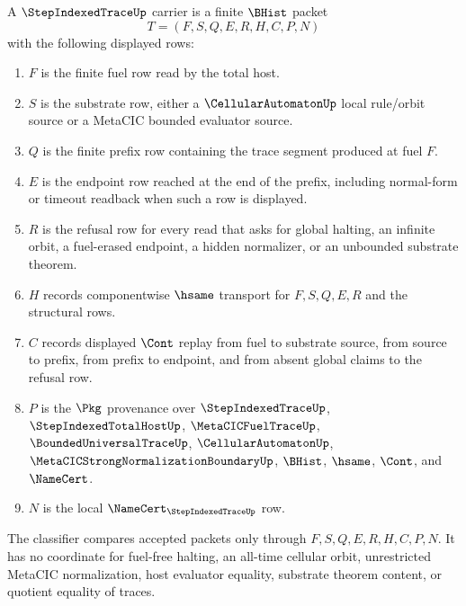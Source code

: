 \begin{definition}
\label{def:step-indexed-trace-carrier}
A $\StepIndexedTraceUp$ carrier is a finite $\BHist$ packet
$$
T=(F,S,Q,E,R,H,C,P,N)
$$
with the following displayed rows:
\begin{enumerate}
\item $F$ is the finite fuel row read by the total host.
\item $S$ is the substrate row, either a $\CellularAutomatonUp$ local rule/orbit source or a MetaCIC bounded evaluator source.
\item $Q$ is the finite prefix row containing the trace segment produced at fuel $F$.
\item $E$ is the endpoint row reached at the end of the prefix, including normal-form or timeout readback when such a row is displayed.
\item $R$ is the refusal row for every read that asks for global halting, an infinite orbit, a fuel-erased endpoint, a hidden normalizer, or an unbounded substrate theorem.
\item $H$ records componentwise $\hsame$ transport for $F,S,Q,E,R$ and the structural rows.
\item $C$ records displayed $\Cont$ replay from fuel to substrate source, from source to prefix, from prefix to endpoint, and from absent global claims to the refusal row.
\item $P$ is the $\Pkg$ provenance over $\StepIndexedTraceUp$, $\StepIndexedTotalHostUp$, $\MetaCICFuelTraceUp$, $\BoundedUniversalTraceUp$, $\CellularAutomatonUp$, $\MetaCICStrongNormalizationBoundaryUp$, $\BHist$, $\hsame$, $\Cont$, and $\NameCert$.
\item $N$ is the local $\NameCert_{\StepIndexedTraceUp}$ row.
\end{enumerate}
The classifier compares accepted packets only through $F,S,Q,E,R,H,C,P,N$. It has no coordinate for fuel-free halting, an all-time cellular orbit, unrestricted MetaCIC normalization, host evaluator equality, substrate theorem content, or quotient equality of traces.
\end{definition}

